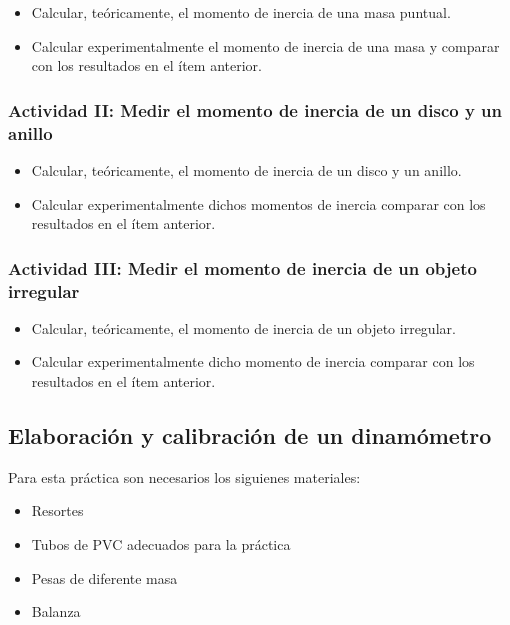 \documentclass[12pt]{article}
\begin{document}
\begin{itemize}
 \item Calcular, teóricamente, el momento de inercia de una masa puntual.
 \item Calcular experimentalmente el momento de inercia de una masa y comparar con los resultados en el ítem anterior.
\end{itemize}

\subsubsection{Actividad II: Medir el momento de inercia de un disco y un anillo}

\begin{itemize}
 \item Calcular, teóricamente, el momento de inercia de un disco y un anillo.
 \item Calcular experimentalmente dichos momentos de inercia comparar con los resultados en el ítem anterior.
\end{itemize}

\subsubsection{Actividad III: Medir el momento de inercia de un objeto irregular}

\begin{itemize}
 \item Calcular, teóricamente, el momento de inercia de un objeto irregular.
 \item Calcular experimentalmente dicho momento de inercia comparar con los resultados en el ítem anterior.
\end{itemize}


\subsection{Elaboración y calibración de un dinamómetro}

Para esta práctica son necesarios los siguienes materiales:

\begin{itemize}
 \item Resortes
 \item Tubos de PVC adecuados para la práctica
 \item Pesas de diferente masa
 \item Balanza
\end{itemize}
\end{document}
